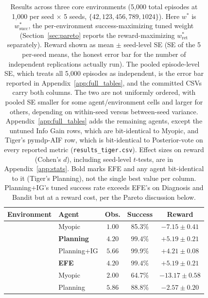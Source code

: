 \begin{table}[ht]
\centering
\caption{Results across three core environments (5{,}000 total episodes at 1{,}000 per seed $\times$ 5 seeds, $\{42,123,456,789,1024\}$). Here $w^*$ is $w^*_{\mathrm{succ}}$, the per-environment success-maximizing tuned weight (Section~\ref{sec:pareto} reports the reward-maximizing $w^*_{\mathrm{ret}}$ separately). Reward shown as mean $\pm$ seed-level SE (SE of the 5 per-seed means, the honest error bar for the number of independent replications actually run). The pooled episode-level SE, which treats all 5{,}000 episodes as independent, is the error bar reported in Appendix~\ref{app:full_tables}, and the committed CSVs carry both columns. The two are not uniformly ordered, with pooled SE smaller for some agent/environment cells and larger for others, depending on within-seed versus between-seed variance. Appendix~\ref{app:full_tables} adds the remaining agents, except the untuned Info Gain rows, which are bit-identical to Myopic, and Tiger's pymdp-AIF row, which is bit-identical to Posterior-vote on every reported metric (\texttt{results\_\allowbreak tiger.csv}). Effect sizes on reward (Cohen's $d$), including seed-level $t$-tests, are in Appendix~\ref{app:stats}. Bold marks EFE and any agent bit-identical to it (Tiger's Planning), not the single best value per column. Planning+IG's tuned success rate exceeds EFE's on Diagnosis and Bandit but at a reward cost, per the Pareto discussion below.}
\label{tab:main}
\begin{tablebody}
\begin{tabular}{llccc}
\toprule
Environment & Agent & Obs. & Success & Reward \\
\midrule
{} & Myopic & $1.00$ & 85.3\% & $-7.15 \pm 0.41$ \\
& \textbf{Planning} & $\mathbf{4.20}$ & $\mathbf{99.4\%}$ & $\mathbf{+5.19 \pm 0.21}$ \\
& Planning+IG & $5.66$ & 99.9\% & $+4.21 \pm 0.08$ \\
& \textbf{EFE} & $\mathbf{4.20}$ & $\mathbf{99.4\%}$ & $\mathbf{+5.19 \pm 0.21}$ \\
\midrule
{} & Myopic & $2.00$ & 64.7\% & $-13.17 \pm 0.58$ \\
& Planning & $5.86$ & 88.8\% & $-2.57 \pm 0.20$ \\

\end{tabular}
\end{tablebody}
\end{table}
